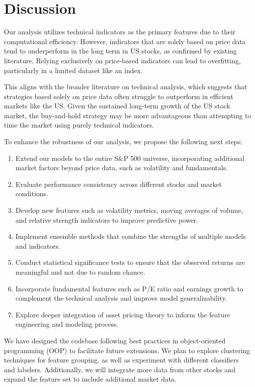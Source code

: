 \documentclass{article}
\begin{document}
\section{Discussion}
Our analysis utilizes technical indicators as the primary features due to their computational efficiency. However, indicators that are solely based on price data tend to underperform in the long term in US stocks, as confirmed by existing literature. Relying exclusively on price-based indicators can lead to overfitting, particularly in a limited dataset like an index.

This aligns with the broader literature on technical analysis, which suggests that strategies based solely on price data often struggle to outperform in efficient markets like the US. Given the sustained long-term growth of the US stock market, the buy-and-hold strategy may be more advantageous than attempting to time the market using purely technical indicators.

To enhance the robustness of our analysis, we propose the following next steps:
\begin{enumerate}
    \item Extend our models to the entire S\&P 500 universe, incorporating additional market factors beyond price data, such as volatility and fundamentals.
    \item Evaluate performance consistency across different stocks and market conditions.
    \item Develop new features such as volatility metrics, moving averages of volume, and relative strength indicators to improve predictive power.
    \item Implement ensemble methods that combine the strengths of multiple models and indicators.
    \item Conduct statistical significance tests to ensure that the observed returns are meaningful and not due to random chance.
    \item Incorporate fundamental features such as P/E ratio and earnings growth to complement the technical analysis and improve model generalizability.
    \item Explore deeper integration of asset pricing theory to inform the feature engineering and modeling process.
\end{enumerate}

We have designed the codebase following best practices in object-oriented programming (OOP) to facilitate future extensions. We plan to explore clustering techniques for feature grouping, as well as experiment with different classifiers and labelers. Additionally, we will integrate more data from other stocks and expand the feature set to include additional market data.
\end{document}
